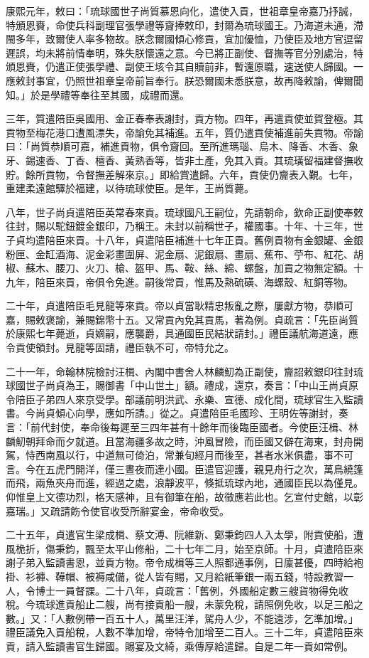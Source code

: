 \begin{pinyinscope}
康熙元年，敕曰：「琉球國世子尚質慕恩向化，遣使入貢，世祖章皇帝嘉乃抒誠，特頒恩賚，命使兵科副理官張學禮等齎捧敕印，封爾為琉球國王。乃海道未通，滯閩多年，致爾使人率多物故。朕念爾國傾心修貢，宜加優恤，乃使臣及地方官逗留遲誤，均未將前情奉明，殊失朕懷遠之意。今已將正副使、督撫等官分別處治，特頒恩賚，仍遣正使張學禮、副使王垓令其自贖前非，暫還原職，速送使人歸國。一應敕封事宜，仍照世祖章皇帝前旨奉行。朕恐爾國未悉朕意，故再降敕諭，俾爾聞知。」於是學禮等奉往至其國，成禮而還。

三年，質遣陪臣吳國用、金正春奉表謝封，貢方物。四年，再遣貢使並賀登極。其貢物至梅花港口遭風漂失，帝諭免其補進。五年，質仍遣貢使補進前失貢物。帝諭曰：「尚質恭順可嘉，補進貢物，俱令齎回。至所進瑪瑙、烏木、降香、木香、象牙、錫速香、丁香、檀香、黃熟香等，皆非土產，免其入貢。其琉璜留福建督撫收貯。餘所貢物，令督撫差解來京。」即給賞遣歸。六年，貢使仍齎表入覲。七年，重建柔遠館驛於福建，以待琉球使臣。是年，王尚質薨。

八年，世子尚貞遣陪臣英常春來貢。琉球國凡王嗣位，先請朝命，欽命正副使奉敕往封，賜以駝鈕鍍金銀印，乃稱王。未封以前稱世子，權國事。十年、十三年，世子貞均遣陪臣來貢。十八年，貞遣陪臣補進十七年正貢。舊例貢物有金銀罐、金銀粉匣、金缸酒海、泥金彩畫圍屏、泥金扇、泥銀扇、畫扇、蕉布、苧布、紅花、胡椒、蘇木、腰刀、火刀、槍、盔甲、馬、鞍、絲、綿、螺盤，加貢之物無定額。十九年，陪臣來貢，帝俱令免進。嗣後常貢，惟馬及熟硫磺、海螺殼、紅銅等物。

二十年，貞遣陪臣毛見龍等來貢。帝以貞當耿精忠叛亂之際，屢獻方物，恭順可嘉，賜敕褒諭，兼賜錦幣十五。又常貢內免其貢馬，著為例。貞疏言：「先臣尚質於康熙七年薨逝，貞嫡嗣，應襲爵，具通國臣民結狀請封。」禮臣議航海道遠，應令貢使領封。見龍等固請，禮臣執不可，帝特允之。

二十一年，命翰林院檢討汪楫、內閣中書舍人林麟魛為正副使，齎詔敕銀印往封琉球國世子尚貞為王，賜御書「中山世土」額。禮成，還京，奏言：「中山王尚貞原令陪臣子弟四人來京受學。部議前明洪武、永樂、宣德、成化間，琉球官生入監讀書。今尚貞傾心向學，應如所請。」從之。貞遣陪臣毛國珍、王明佐等謝封，奏言：「前代封使，奉命後每遲至三四年甚有十餘年而後臨臣國者。今使臣汪楫、林麟魛朝拜命而夕就道。且當海疆多故之時，沖風冒險，而臣國又僻在海東，封舟開駕，恃西南風以行，中道無可倚泊，常兼旬經月而後至，甚者水米俱盡，事不可言。今在五虎門開洋，僅三晝夜而達小國。臣遣官迎護，親見舟行之次，萬鳥繞篷而飛，兩魚夾舟而進，經過之處，浪靜波平，倏抵琉球內地，通國臣民以為僅見。仰惟皇上文德功烈，格天感神，且有御筆在船，故徵應若此也。乞宣付史館，以彰嘉瑞。」又疏請飭令使官收受所辭宴金，帝命收受。

二十五年，貞遣官生梁成楫、蔡文溥、阮維新、鄭秉鈞四人入太學，附貢使船，遭風桅折，傷秉鈞，飄至太平山修船，二十七年二月，始至京師。十月，貞遣陪臣來謝子弟入監讀書恩，並貢方物。帝令成楫等三人照都通事例，日廩甚優，四時給袍褂、衫褲、鞾帽、被褥咸備，從人皆有賜，又月給紙筆銀一兩五錢，特設教習一人，令博士一員督課。二十八年，貞疏言：「舊例，外國船定數三艘貨物得免收稅。今琉球進貢船止二艘，尚有接貢船一艘，未蒙免稅，請照例免收，以足三船之數。」又：「人數例帶一百五十人，萬里汪洋，駕舟人少，不能遠涉，乞準加增。」禮臣議免入貢船稅，人數不準加增，帝特令加增至二百人。三十二年，貞遣陪臣來貢，請入監讀書官生歸國。賜宴及文綺，乘傳厚給遣歸。自是二年一貢如常例。


\end{pinyinscope}
